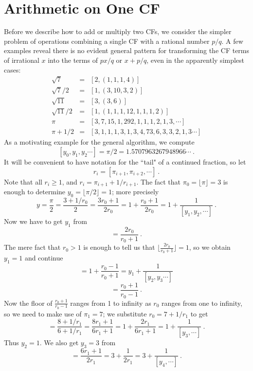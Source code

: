 \documentclass[11pt, oneside]{amsart}   	%
\begin{document}
\section{Arithmetic on One CF}
Before we describe how to add or multiply two CFs, we consider the simpler problem of operations combining a single CF with a
rational number $p/q$. A few examples reveal there is no evident general pattern for transforming the CF terms of irrational $x$ into
the terms of $px/q$ or $x + p/q$, even in the apparently simplest cases:
\begin{eqnarray*}
\sqrt{7} & = & [2, (1, 1, 1, 4)] \\
\sqrt{7}/2 & = & [1, (3, 10, 3, 2)] \\
\sqrt{11} & = & [3, (3, 6)] \\
\sqrt{11}/2 & = & [1, (1, 1, 1, 12, 1, 1, 1, 2)] \\
\pi & = & [3,7,15,1,292,1,1,1, 2, 1, 3,\cdots]\\
\pi + 1/2 & = & [3, 1, 1, 1, 3, 1, 3, 4, 73, 6, 3, 3, 2, 1, 3\cdots]
\end{eqnarray*}
As a motivating example for the general algorithm, we compute
\[[y_0,y_1,y_2 \cdots] = \pi/2 = 1.5707963267948966\cdots\ .
\]
It will be convenient to have notation for the ``tail" of a continued fraction, so let
\[
r_i = [\pi_{i+1}, \pi_{i+2},\cdots]\ .
\]
Note that all $r_i \geq 1$, and $r_i = \pi_{i+1} + 1/r_{i+1}$. The fact that $\pi_0 = \lfloor \pi \rfloor= 3$
is enough to determine $y_0=\lfloor \pi/2 \rfloor=1$; more precisely
\begin{equation*}
y = \frac{\pi}{2} = \frac{3 + 1/r_0}{2} = \frac{3r_0+1}{2r_0} = 1 + \frac{r_0+1}{2r_0}= 1 + \frac{1}{[y_1,y_2,\cdots]}\ .
\end{equation*}
Now we have to get $y_1$ from 
\begin{equation*}
[y_1,y_2,\cdots] = \frac{2r_0}{r_0+1}\ .
\end{equation*}
The mere fact that $r_0>1$ is enough to tell us that $\lfloor \frac{2r_0}{r_0+1} \rfloor = 1$, so we obtain $y_1=1$ and continue
\begin{equation*}
[y_1,y_2,\cdots] = 1 + \frac{r_0-1}{r_0+1} = y_1 + \frac{1}{[y_2,y_3\cdots]}
\end{equation*}
\begin{equation*}
[y_2,\cdots] = \frac{r_0+1}{r_0-1} \ .
\end{equation*}
Now the floor of $\frac{r_0+1}{r_0-1}$ ranges from 1 to infinity as $r_0$ ranges from one to infinity,
so we need to make use of $\pi_1 = 7$; we substitute $r_0 = 7+1/r_1$ to get
\begin{equation*}
[y_2,\cdots] = \frac{8 + 1/r_1}{6 + 1/r_1} = \frac{8r_1 + 1}{6r_1 + 1} = 1 + \frac{2r_1}{6r_1 + 1}= 1 + \frac{1}{[y_3,\cdots]}\ .
\end{equation*}
Thus $y_2=1$.  We also get $y_3 = 3$ from
\begin{equation*}
[y_3,\cdots] =  \frac{6r_1 + 1}{2r_1} = 3 + \frac{1}{2r_1} = 3 + \frac{1}{[y_4,\cdots]}\ .
\end{equation*}
\end{document}
